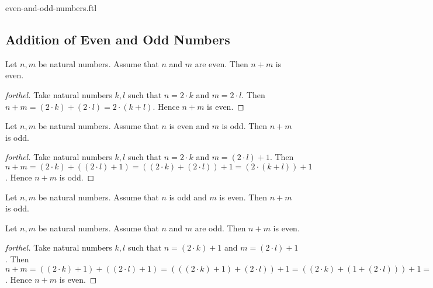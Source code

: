 \documentclass{naproche-library}
\begin{document}
\begin{smodule}{even-and-odd-numbers.ftl}
  \subsection*{Addition of Even and Odd Numbers}

  \begin{proposition}[forthel,id=ARITHMETIC_15_7845441256365256]
    Let $n, m$ be natural numbers.
    Assume that $n$ and $m$ are even.
    Then $n + m$ is even.
  \end{proposition}
  \begin{proof}[forthel]
    Take natural numbers $k, l$ such that $n = 2 \cdot k$ and $m = 2 \cdot l$.
    Then $n + m
      = (2 \cdot k) + (2 \cdot l)
      = 2 \cdot (k + l)$.
    Hence $n + m$ is even.
  \end{proof}

  \begin{proposition}[forthel,id=ARITHMETIC_15_1023655256985478]
    Let $n, m$ be natural numbers.
    Assume that $n$ is even and $m$ is odd.
    Then $n + m$ is odd.
  \end{proposition}
  \begin{proof}[forthel]
    Take natural numbers $k, l$ such that $n = 2 \cdot k$ and $m = (2 \cdot l) + 1$.
    Then $n + m
      = (2 \cdot k) + ((2 \cdot l) + 1)
      = ((2 \cdot k) + (2 \cdot l)) + 1
      = (2 \cdot (k + l)) + 1$.
    Hence $n + m$ is odd.
  \end{proof}

  \begin{corollary}[forthel,id=ARITHMETIC_15_0125412589658745]
    Let $n, m$ be natural numbers.
    Assume that $n$ is odd and $m$ is even.
    Then $n + m$ is odd.
  \end{corollary}

  \begin{proposition}[forthel,id=ARITHMETIC_15_1023659854785412]
    Let $n, m$ be natural numbers.
    Assume that $n$ and $m$ are odd.
    Then $n + m$ is even.
  \end{proposition}
  \begin{proof}[forthel]
    Take natural numbers $k, l$ such that $n = (2 \cdot k) + 1$ and $m = (2 \cdot l) + 1$.
    Then $n + m
      = ((2 \cdot k) + 1) + ((2 \cdot l) + 1)
      = (((2 \cdot k) + 1) + (2 \cdot l)) + 1
      = ((2 \cdot k) + (1 + (2 \cdot l))) + 1
      = ((2 \cdot k) + ((2 \cdot l) + 1)) + 1
      = (((2 \cdot k) + (2 \cdot l)) + 1) + 1
      = ((2 \cdot k) + (2 \cdot l)) + (1 + 1)
      = ((2 \cdot k) + (2 \cdot l)) + 2
      = (2 \cdot (k + l)) + 2
      = 2 \cdot ((k + l) + 1)$.
      Hence $n + m$ is even.
  \end{proof}



\end{smodule}
\end{document}
